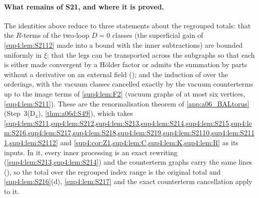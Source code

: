 \paragraph{What remains of S21, and where it is proved.} The identities above reduce \cite[(3.5)]{Ba3} to three statements about the regrouped totals: that the $R$-terms of the two-loop $D=0$ classes (the superficial gain of \cref{sup4:lem:S2112} made into a bound with the inner subtractions) are bounded uniformly in $\xi$; that the legs can be transported across the subgraphs \cite[(2.4)]{Ba3} so that each is either made convergent by a H\"older factor or admits the summation by parts \cite[(2.8)]{Ba3} without a derivative on an external field (\cite[p.~443]{Ba3}); and the induction of \cite[pp.~444--445]{Ba3} over the orderings, with the vacuum classes cancelled exactly by the vacuum counterterms \cite[(1.24)]{Ba3} up to the image terms of \cref{sup4:lem:F2} (vacuum graphs of at most six vertices, \cref{sup4:lem:S211}). These are the renormalisation theorem of \cref{app:a06_BALtorus} (Step~3(D$_4$), \cref{thm:a06d:S49}), which takes \cref{sup4:lem:S211,sup4:lem:S212,sup4:lem:S213,sup4:lem:S214,sup4:lem:S215,sup4:lem:S216,sup4:lem:S217,sup4:lem:S218,sup4:lem:S219,sup4:lem:S2110,sup4:lem:S2111,sup4:lem:S2112} and \cref{sup4:cor:Z1,sup4:lem:C,sup4:lem:K,sup4:lem:R} as its inputs. In it, every inner processing is an exact rewriting (\cref{sup4:lem:S213,sup4:lem:S214}) and the counterterm graphs carry the same lines (\cite[p.~417]{Ba3}), so the total over the regrouped index range is the original total and \cref{sup4:lem:S216}(d), \cref{sup4:lem:S217} and the exact counterterm cancellation apply to it.
